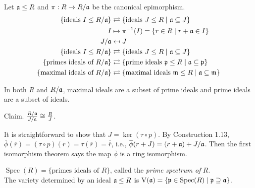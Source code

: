 \begin{fact}
    Let $\mathfrak{a} \leq R$ and $\pi: R \to R/\mathfrak{a}$ be the canonical epimorphism. 
    \begin{align*}
        \{\text{ideals }I \leq R/\mathfrak{a}\} &\rightleftarrows \{\text{ideals }J \leq R \mid \mathfrak{a} \subseteq J\} \\
        I &\mapsto \pi^{-1}(I) = \{r \in R \mid r + \mathfrak{a} \in I\} \\
        J/\mathfrak{a} &\mapsfrom J \\
    \{\text{ideals } I \leq R/\mathfrak{a}\} &\rightleftarrows \{\text{ideals }J \leq R \mid \mathfrak{a} \subseteq J\} \\
        \{\text{primes ideals of } R/\mathfrak{a}\} &\rightleftarrows \{\text{prime ideals }\mathfrak{p} \leq R \mid \mathfrak{a} \subseteq \mathfrak{p}\} \\
        \{\text{maximal ideals of } R/\mathfrak{a}\} &\rightleftarrows \{\text{maximal ideals }\mathfrak{m} \leq R \mid \mathfrak{a} \subseteq \mathfrak{m}\}
    \end{align*}
    \par
    In both $R$ and $R/\mathfrak{a}$, maximal ideals are a subset of prime ideals and prime ideals are a subset of ideals. \par
    Claim. $\frac{R/\mathfrak{a}}{J/\mathfrak{a}} \cong \frac{R}{J}$.
    \begin{center}
    \end{center}
    It is straightforward to show that $J = \ker(\tau \circ p)$. By Construction 1.13, $\overbar \phi(\overbar r) = (\tau \circ p)(r) = \tau(\overbar r)= \overbar{\overbar r}$, i.e., $\overbar \phi(r + J) = (r+\ffa) + J/\ffa$. Then the first isomorphism theorem says the map $\overbar \phi$ is a ring isomorphism.
\end{fact}

\begin{notation*}
    $\operatorname{Spec}(R) = \{\text{primes ideals of $R$}\}$, called the \emph{prime spectrum of} $R$. \\
    The variety determined by an ideal $\mathfrak{a} \leq R$ is $\operatorname{V}(\mathfrak{a}) = \{\mathfrak{p} \in \operatorname{Spec}(R) \mid \mathfrak{p} \supseteq \mathfrak{a}\}$.
\end{notation*}

